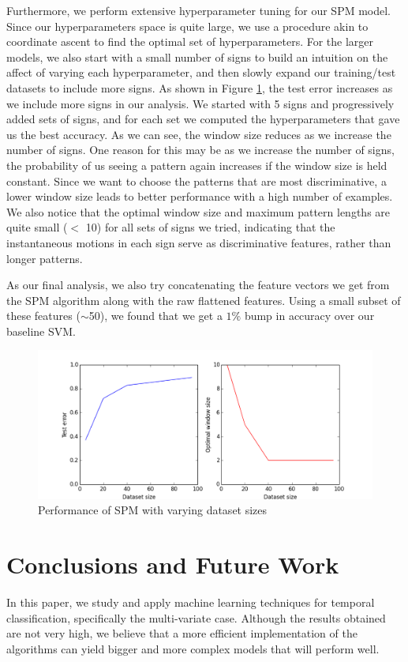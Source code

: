 \documentclass[twocolumn]{article}
\begin{document}
Furthermore, we perform extensive hyperparameter tuning for our SPM model. Since our hyperparameters space is quite large, we use a procedure akin to coordinate ascent to find the optimal set of hyperparameters. For the larger models, we also start with a small number of signs to build an intuition on the affect of varying each hyperparameter, and then slowly expand our training/test datasets to include more signs. As shown in Figure \ref{fig:spm_performance}, the test error increases as we include more signs in our analysis. We started with 5 signs and progressively added sets of signs, and for each set we computed the hyperparameters that gave us the best accuracy. As we can see, the window size reduces as we increase the number of signs. One reason for this may be as we increase the number of signs, the probability of us seeing a pattern again increases if the window size is held constant. Since we want to choose the patterns that are most discriminative, a lower window size leads to better performance with a high number of examples. We also notice that the optimal window size and maximum pattern lengths are quite small ($<$ 10) for all sets of signs we tried, indicating that the instantaneous motions in each sign serve as discriminative features, rather than longer patterns.

As our final analysis, we also try concatenating the feature vectors we get from the SPM algorithm along with the raw flattened features. Using a small subset of these features ($\sim$50), we found that we get a $1\%$ bump in accuracy over our baseline SVM. 

\begin{figure}[h]
    \centering
    \includegraphics[trim=50 0 30 0, clip,width=0.95\linewidth]{results/SPM_performance}
    \caption{Performance of SPM with varying dataset sizes}
    \label{fig:spm_performance}
\end{figure}
\section{Conclusions and Future Work}
In this paper, we study and apply machine learning techniques for temporal classification, specifically the multi-variate case. Although the results obtained are not very high, we believe that a more efficient implementation of the algorithms can yield bigger and more complex models that will perform well. 
\end{document}
